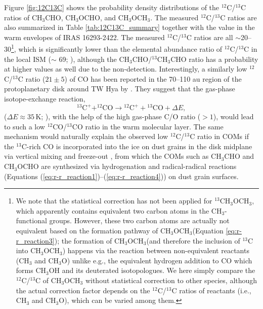 \documentclass[linenumbers, twocolumn, twocolappendix, astrosymb, times]{aastex631}
\newcommand{\acetaldehyde}{CH$_3$CHO\xspace}
\newcommand{\methylformate}{CH$_3$OCHO\xspace}
\newcommand{\dimethylether}{CH$_3$OCH$_3$\xspace}
\begin{document}
Figure \ref{fig:12C13C} shows the probability density distributions of the $^{12}$C/$^{13}$C ratios of \acetaldehyde, \methylformate, and \dimethylether. The measured $^{12}$C/$^{13}$C ratios are also summarized in Table \ref{tab:12C13C_summary} together with the value in the warm envelopes of IRAS 16293-2422.  The measured $^{12}$C/$^{13}$C ratios are all $\sim$20--30\footnote{We note that the statistical correction has not been applied for $^{13}$\dimethylether, which apparently contains equivalent two carbon atoms in the CH$_3$- functional groups. However, these two carbon atoms are actually not equivalent based on the formation pathway of \dimethylether (Equation \ref{eq:r-r_reaction3}); the formation of \dimethylether (and therefore the inclusion of $^{13}$C into \dimethylether) happens via the reaction between non-equivalent reactants (CH$_3$ and CH$_3$O) unlike e.g., the equivalent hydrogen addition to CO which forms CH$_3$OH and its deuterated isotopologues. We here simply compare the $^{12}$C/$^{13}$C of \dimethylether without statistical correction to other species, although the actual correction factor depends on the $^{12}$C/$^{13}$C ratios of reactants (i.e., CH$_3$ and CH$_3$O), which can be varied among them.}, which is significantly lower than the elemental abundance ratio of $^{12}$C/$^{13}$C in the local ISM ($\sim$ 69; \citealt{Wilson1999}), although the \acetaldehyde/$^{13}$CH$_3$CHO ratio has a probability at higher values as well due to the non-detection. Interestingly, a similarly low $^{12}$C/$^{13}$C ratio ($21\pm5$) of CO has been reported in the 70--110 au region of the protoplanetary disk around TW Hya by \citet{Yoshida2022_12CO13CO} \citep[see also][]{Zhang2017}. They suggest that the gas-phase isotope-exchange reaction, 
\begin{equation}\label{eq:12C13C_reaction}
    ^{13}\mathrm{C}^+ + ^{12}\mathrm{CO} \to {}^{12}\mathrm{C}^+ + {}^{13}\mathrm{CO} + \Delta E,
\end{equation}
($\Delta E \approx 35$\,K; \citealt{Langer1984, Furuya2011}), with the help of the high gas-phase C/O ratio ($> 1$), would lead to such a low $^{12}$CO/$^{13}$CO ratio in the warm molecular layer. The same mechanism would naturally explain the observed low $^{12}$C/$^{13}$C ratio in COMs if the $^{13}$C-rich CO is incorporated into the ice on dust grains in the disk midplane via vertical mixing and freeze-out \citep{Furuya2022}, from which the COMs such as \acetaldehyde and \methylformate are synthesized via hydrogenation and radical-radical reactions (Equations (\ref{eq:r-r_reaction1})--(\ref{eq:r-r_reaction4})) on dust grain surfaces.
\end{document}
